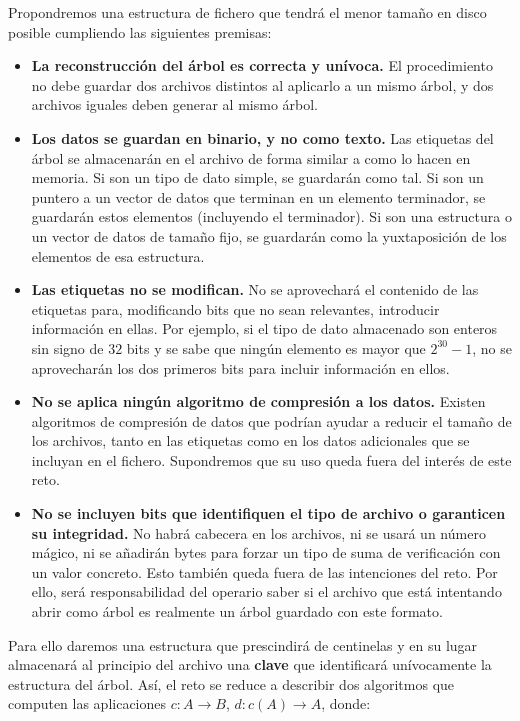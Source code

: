 \documentclass{article}
\begin{document}
Propondremos una estructura de fichero que tendrá el menor tamaño en disco
posible cumpliendo las siguientes premisas:
\begin{itemize}
	\item \textbf{La reconstrucción del árbol es correcta y unívoca.}
  El procedimiento no debe guardar dos archivos distintos al aplicarlo a un mismo
  árbol, y dos archivos iguales deben generar al mismo árbol.
	\item \textbf{Los datos se guardan en binario, y no como texto.} Las etiquetas
  del árbol se almacenarán en el archivo de forma similar a como lo hacen en
  memoria. Si son un tipo de dato simple, se guardarán como tal. Si son un puntero
  a un vector de datos que terminan en un elemento terminador, se guardarán
  estos elementos (incluyendo el terminador). Si son una estructura o un vector
  de datos de tamaño fijo, se guardarán como la yuxtaposición de los elementos
  de esa estructura.
	\item \textbf{Las etiquetas no se modifican.} No se aprovechará el contenido
  de las etiquetas para, modificando bits que no sean relevantes, introducir
  información en ellas. Por ejemplo, si el tipo de dato almacenado son enteros
  sin signo de $32$ bits y se sabe que ningún elemento es mayor que $2^{30}-1$,
  no se aprovecharán los dos primeros bits para incluir información en ellos.
	\item \textbf{No se aplica ningún algoritmo de compresión a los datos.}
  Existen algoritmos de compresión de datos que podrían ayudar a reducir el
  tamaño de los archivos, tanto en las etiquetas como en los datos adicionales
  que se incluyan en el fichero. Supondremos que su uso queda fuera del interés
  de este reto.
	\item \textbf{No se incluyen bits que identifiquen el tipo de archivo
  o garanticen su integridad.} No habrá cabecera en los archivos, ni se usará un
  número mágico, ni se añadirán bytes para forzar un tipo de suma de verificación
  con un valor concreto. Esto también queda fuera de las intenciones del reto.
  Por ello, será responsabilidad del operario saber si el archivo que está
  intentando abrir como árbol es realmente un árbol guardado con este formato.
\end{itemize}

Para ello daremos una estructura que prescindirá de centinelas y en su lugar
almacenará al principio del archivo una \textbf{clave} que identificará
unívocamente la estructura del árbol. Así, el reto se reduce a describir dos
algoritmos que computen las aplicaciones $c: A \to B$, $d: c(A) \to A$, donde:
\end{document}
